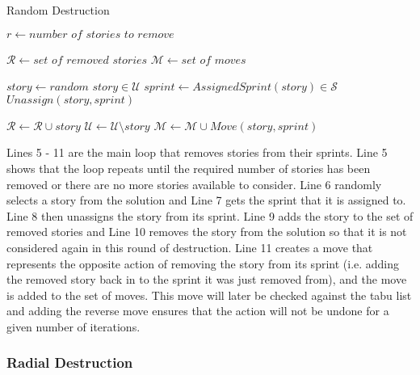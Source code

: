 \begin{algorithm}[H]
\caption{Random Destruction}\label{random_destruction}
\begin{algorithmic}[1]
    \State $r \gets \textit{number of stories to remove}$
    
        \State $\mathcal{R} \gets \textit{set of removed stories}$
        \State $\mathcal{M} \gets \textit{set of moves}$
        
            \State $story \gets \textit{random story} \in \mathcal{U}$
            \State $sprint \gets AssignedSprint(story) \in \mathcal{S}$
            \State $Unassign(story, sprint)$
            
            \State $\mathcal{R} \gets \mathcal{R} \cup story$
            \State $\mathcal{U} \gets \mathcal{U} \setminus story$
            \State $\mathcal{M} \gets \mathcal{M} \cup Move(story, sprint)$
        \EndWhile
        
        \State {}
    \EndProcedure
\end{algorithmic}
\end{algorithm}

Lines 5 - 11 are the main loop that removes stories from their sprints. Line 5 shows that the loop repeats until the required number of stories has been removed or there are no more stories available to consider. Line 6 randomly selects a story from the solution and Line 7 gets the sprint that it is assigned to. Line 8 then unassigns the story from its sprint. Line 9 adds the story to the set of removed stories and Line 10 removes the story from the solution so that it is not considered again in this round of destruction. Line 11 creates a move that represents the opposite action of removing the story from its sprint (i.e. adding the removed story back in to the sprint it was just removed from), and the move is added to the set of moves. This move will later be checked against the tabu list and adding the reverse move ensures that the action will not be undone for a given number of iterations.

\subsubsection{Radial Destruction}

